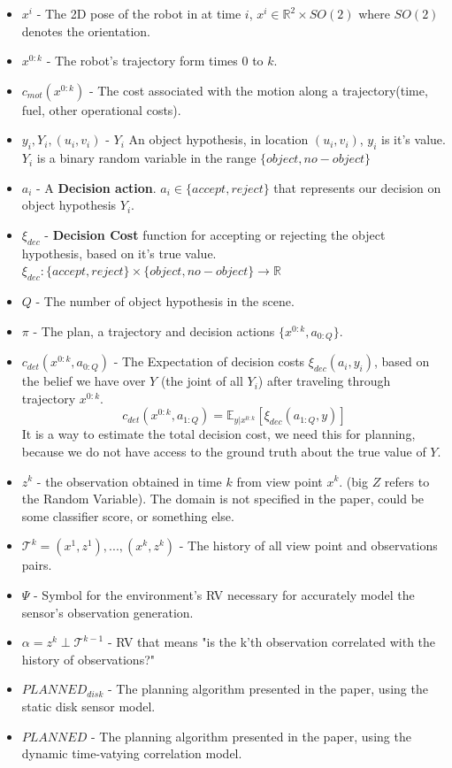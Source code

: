 \documentclass{article}
\begin{document}
	\begin{itemize}
		\item $x^i$ - The 2D pose of the robot in at time $i$,
		$x^i \in \mathbb{R}^2 \times SO(2)$ where $SO(2)$ denotes the orientation.
		\item $x^{0:k}$ - The robot's trajectory form times $0$ to $k$.
		\item $c_{mot}(x^{0:k})$ - The cost associated with the motion along a trajectory(time, fuel, other operational costs).
		\item $y_i, Y_i, (u_i, v_i)$ - $Y_i$ An object hypothesis, in location $(u_i, v_i)$,
		$y_i$ is it's value. $Y_i$ is a binary random variable in the range $\{object,no-object\}$
		\item $a_i$ - A \textbf{Decision action}. $a_i\in\{accept,reject\}$ that represents our decision on object hypothesis $Y_i$. 
		\item $\xi_{dec}$ - \textbf{Decision Cost} function for accepting or rejecting the object hypothesis, based on it's true value.
		$\xi_{dec} : \{accept,reject\}\times\{object,no-object\}\rightarrow\mathbb{R}$ 
		\item $Q$ - The number of object hypothesis in the scene.
		\item $\pi$ - The plan, a trajectory and decision actions $\{x^{0:k},a_{0:Q}\}$.
		\item $c_{det}(x^{0:k},a_{0:Q})$ - The Expectation of decision costs $\xi_{dec}(a_i,y_i)$, based on the belief we have over $Y$ (the joint of all $Y_i$) after traveling through trajectory $x^{0:k}$.
		\begin{equation}
		c_{det}(x^{0:k},a_{1:Q})=\mathbb{E}_{y|x^{0:k}}[\xi_{dec}(a_{1:Q},y)]
		\end{equation}  
		It is a way to estimate the total decision cost, we need this for planning, because we do not have access to the ground truth about the true value of $Y$.
		\item $z^k$ - the observation obtained in time $k$ from view point $x^k$. (big $Z$ refers to the Random Variable). The domain is not specified in the paper, could be some classifier score, or something else.
		\item $\mathcal{T}^k = {(x^1,z^1),...,(x^k,z^k)}$ - The history of all view point and observations pairs.
		\item $\Psi$ - Symbol for the environment's RV necessary for accurately model the sensor's observation generation.
		\item $\alpha = z^k \perp \mathcal{T}^{k-1}$ - RV that means "is the k'th observation correlated with the history of observations?"
		\item $PLANNED_{disk}$ - The planning algorithm presented in the paper, using the static disk sensor model.
		\item $PLANNED$ - The planning algorithm presented in the paper, using the dynamic time-vatying correlation model.
	\end{itemize}
\end{document}
